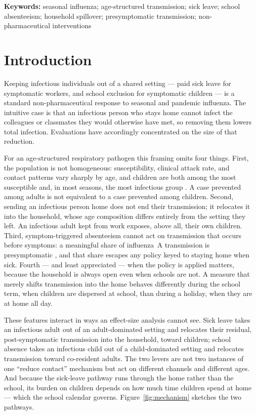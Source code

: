 \documentclass[12pt]{article}
\theoremstyle{plain}
\theoremstyle{remark}
\theoremstyle{definition}
\begin{document}
\noindent\textbf{Keywords:} seasonal influenza; age-structured transmission; sick leave; school absenteeism; household spillover; presymptomatic transmission; non-pharmaceutical interventions

\section{Introduction}
Keeping infectious individuals out of a shared setting --- paid sick leave for symptomatic workers, and school exclusion for symptomatic children --- is a standard non-pharmaceutical response to seasonal and pandemic influenza. The intuitive case is that an infectious person who stays home cannot infect the colleagues or classmates they would otherwise have met, so removing them lowers total infection. Evaluations have accordingly concentrated on the size of that reduction.

For an age-structured respiratory pathogen this framing omits four things. First, the population is not homogeneous: susceptibility, clinical attack rate, and contact patterns vary sharply by age, and children are both among the most susceptible and, in most seasons, the most infectious group \cite{Jayasundara2014,Cauchemez2009}. A case prevented among adults is not equivalent to a case prevented among children. Second, sending an infectious person home does not end their transmission; it relocates it into the household, whose age composition differs entirely from the setting they left. An infectious adult kept from work exposes, above all, their own children. Third, symptom-triggered absenteeism cannot act on transmission that occurs before symptoms: a meaningful share of influenza~A transmission is presymptomatic \cite{NatureHealth2026,Lau2010}, and that share escapes any policy keyed to staying home when sick. Fourth --- and least appreciated --- when the policy is applied matters, because the household is always open even when schools are not. A measure that merely shifts transmission into the home behaves differently during the school term, when children are dispersed at school, than during a holiday, when they are at home all day.

These features interact in ways an effect-size analysis cannot see. Sick leave takes an infectious adult out of an adult-dominated setting and relocates their residual, post-symptomatic transmission into the household, toward children; school absence takes an infectious child out of a child-dominated setting and relocates transmission toward co-resident adults. The two levers are not two instances of one ``reduce contact'' mechanism but act on different channels and different ages. And because the sick-leave pathway runs through the home rather than the school, its burden on children depends on how much time children spend at home --- which the school calendar governs. Figure~\ref{fig:mechanism} sketches the two pathways.
\end{document}

